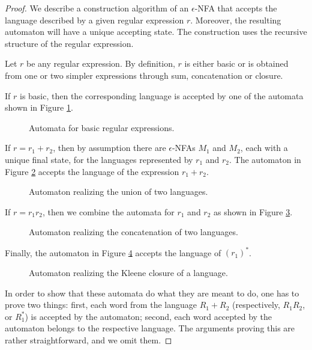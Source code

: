 \begin{proof}
We describe a construction algorithm of an $\epsilon$-NFA that accepts the language described by a given regular expression $r$.
Moreover, the resulting automaton will have a unique accepting state.
The construction uses the recursive structure of the regular expression.

Let $r$ be any regular expression.
By definition, $r$ is either basic or is obtained from one or two simpler expressions through sum, concatenation or closure.

If $r$ is basic, then the corresponding language is accepted by one of the automata shown in Figure \ref{fig:AutomBasicRegExpr}.

\begin{figure}[ht]
\begin{center}

\end{center}
\caption{Automata for basic regular expressions.}
\label{fig:AutomBasicRegExpr}
\end{figure}

If $r = r_1 + r_2$, then by assumption there are $\epsilon$-NFAs $M_1$ and $M_2$,
each with a unique final state, for the languages represented by $r_1$ and $r_2$.
The automaton in Figure \ref{fig:AutomSum} accepts the language of the expression $r_1 + r_2$.

\begin{figure}[ht]
\begin{center}

\end{center}
\caption{Automaton realizing the union of two languages.}
\label{fig:AutomSum}
\end{figure}

If $r = r_1r_2$, then we combine the automata for $r_1$ and $r_2$ as shown in Figure \ref{fig:AutomConcat}.

\begin{figure}[ht]
\begin{center}

\end{center}
\caption{Automaton realizing the concatenation of two languages.}
\label{fig:AutomConcat}
\end{figure}

Finally, the automaton in Figure \ref{fig:AutomClosure} accepts the language of $(r_1)^*$.

\begin{figure}[ht]
\begin{center}

\end{center}
\caption{Automaton realizing the Kleene closure of a language.}
\label{fig:AutomClosure}
\end{figure}

In order to show that these automata do what they are meant to do, one has to prove two things:
first, each word from the language $R_1 + R_2$ (respectively, $R_1R_2$, or $R_1^*$) is accepted by the automaton;
second, each word accepted by the automaton belongs to the respective language.
The arguments proving this are rather straightforward, and we omit them.
\end{proof}
